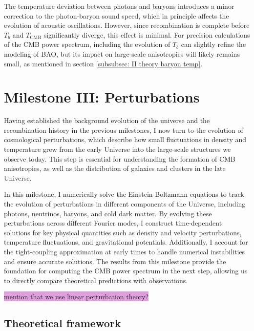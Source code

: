 \documentclass{aa}
\numberwithin{equation}{section}
\numberwithin{table}{section}
\numberwithin{figure}{section}
\begin{document}
The temperature deviation between photons and baryons introduces a minor correction to the photon-baryon sound speed, which in principle affects the evolution of acoustic oscillations. However, since recombination is complete before $T_b$ and $T_\text{CMB}$ significantly diverge, this effect is minimal. For precision calculations of the CMB power spectrum, including the evolution of $T_b$ can slightly refine the modeling of BAO, but its impact on large-scale anisotropies will likely remains small, as mentioned in section \ref{subsubsec: II theory baryon temp}.








\section{Milestone III: Perturbations}\label{sec: milestone III}
Having established the background evolution of the universe and the recombination history in the previous milestones, I now turn to the evolution of cosmological perturbations, which describe how small fluctuations in density and temperature grew from the early Universe into the large-scale structures we observe today. This step is essential for understanding the formation of CMB anisotropies, as well as the distribution of galaxies and clusters in the late Universe. 

In this milestone, I numerically solve the Einstein-Boltzmann equations to track the evolution of perturbations in different components of the Universe, including photons, neutrinos, baryons, and cold dark matter. By evolving these perturbations across different Fourier modes, I construct time-dependent solutions for key physical quantities such as density and velocity perturbations, temperature fluctuations, and gravitational potentials. Additionally, I account for the tight-coupling approximation at early times to handle numerical instabilities and ensure accurate solutions. The results from this milestone provide the foundation for computing the CMB power spectrum in the next step, allowing us to directly compare theoretical predictions with observations.

\colorbox{Plum}{mention that we use linear perturbation theory?}


\subsection{Theoretical framework}\label{subsec: III theory}
\end{document}
